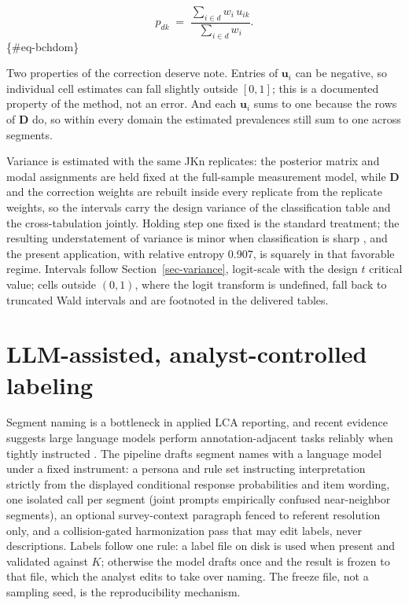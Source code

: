 \documentclass[
  12pt]{article}
\begin{document}
\[\hat p_{dk} \;=\; \frac{\sum_{i \in d} w_i\, u_{ik}}{\sum_{i \in d} w_i}.\]
\{\#eq-bchdom\}

Two properties of the correction deserve note. Entries of
\(\mathbf{u}_i\) can be negative, so individual cell estimates can fall
slightly outside \([0, 1]\); this is a documented property of the
method, not an error. And each \(\mathbf{u}_i\) sums to one because the
rows of \(\mathbf{D}\) do, so within every domain the estimated
prevalences still sum to one across segments.

Variance is estimated with the same JKn replicates: the posterior matrix
and modal assignments are held fixed at the full-sample measurement
model, while \(\mathbf{D}\) and the correction weights are rebuilt
inside every replicate from the replicate weights, so the intervals
carry the design variance of the classification table and the
cross-tabulation jointly. Holding step one fixed is the standard
treatment; the resulting understatement of variance is minor when
classification is sharp \citep{bakk2014, bakk2013}, and the present
application, with relative entropy 0.907, is squarely in that favorable
regime. Intervals follow Section~\ref{sec-variance}, logit-scale with
the design \(t\) critical value; cells outside \((0, 1)\), where the
logit transform is undefined, fall back to truncated Wald intervals and
are footnoted in the delivered tables.

\section{LLM-assisted, analyst-controlled labeling}\label{sec-labeling}

Segment naming is a bottleneck in applied LCA reporting, and recent
evidence suggests large language models perform annotation-adjacent
tasks reliably when tightly instructed \citep{gilardi2023, ziems2024}.
The pipeline drafts segment names with a language model under a fixed
instrument: a persona and rule set instructing interpretation strictly
from the displayed conditional response probabilities and item wording,
one isolated call per segment (joint prompts empirically confused
near-neighbor segments), an optional survey-context paragraph fenced to
referent resolution only, and a collision-gated harmonization pass that
may edit labels, never descriptions. Labels follow one rule: a label
file on disk is used when present and validated against \(K\); otherwise
the model drafts once and the result is frozen to that file, which the
analyst edits to take over naming. The freeze file, not a sampling seed,
is the reproducibility mechanism.
\end{document}
